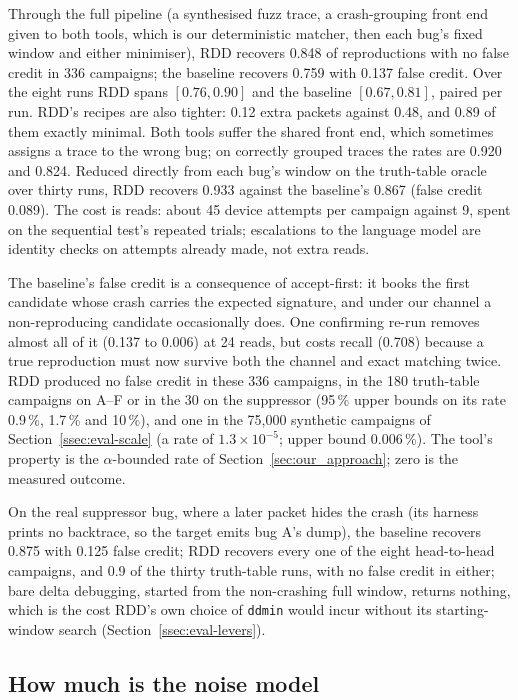 Through the full pipeline (a synthesised fuzz trace, a crash-grouping front end given to both tools, which is
our deterministic matcher, then each bug's fixed window and either minimiser), RDD
recovers 0.848 of reproductions with no false credit in 336 campaigns; the
baseline recovers 0.759 with 0.137 false credit. %
Over the eight runs RDD spans $[0.76, 0.90]$ and the baseline $[0.67, 0.81]$,
paired per run. RDD's recipes are also tighter: 0.12 extra packets against 0.48,
and 0.89 of them exactly minimal. Both tools suffer the shared front end, which
sometimes assigns a trace to the wrong bug; on correctly grouped traces the rates
are 0.920 and 0.824. Reduced directly from each bug's window on the truth-table
oracle over thirty runs, RDD recovers 0.933 against the baseline's 0.867
(false credit 0.089). %
The cost is reads: about 45 device attempts per campaign against 9, spent on the
sequential test's repeated trials; escalations to the language model are identity
checks on attempts already made, not extra reads.

The baseline's false credit is a consequence of accept-first: it books the first
candidate whose crash carries the expected signature, and under our channel a
non-reproducing candidate occasionally does. One confirming re-run removes almost
all of it (0.137 to 0.006) at 24 reads, but costs recall (0.708) because a true
reproduction must now survive both the channel and exact matching twice. RDD produced no false credit in these 336 campaigns, in the 180 truth-table campaigns
on A--F or in the 30 on the suppressor (95\,\% upper bounds on its rate 0.9\,\%,
1.7\,\% and 10\,\%), and one in the 75,000 synthetic campaigns of
Section~\ref{ssec:eval-scale} (a rate of $1.3\times10^{-5}$; upper bound 0.006\,\%). The tool's property is the
$\alpha$-bounded rate of Section~\ref{sec:our_approach}; zero is the measured outcome.

On the real suppressor bug, where a later packet hides the crash (its harness prints
no backtrace, so the target emits bug A's dump), the baseline
recovers 0.875 with 0.125 false credit; RDD recovers every one of the eight
head-to-head campaigns, and 0.9 of the thirty truth-table runs, with no false credit
in either;
bare delta debugging, started from the non-crashing full window, returns nothing,
which is the cost RDD's own choice of \texttt{ddmin} would incur without its
starting-window search (Section~\ref{ssec:eval-levers}).

\subsection{How much is the noise model}\label{ssec:eval-noise}

